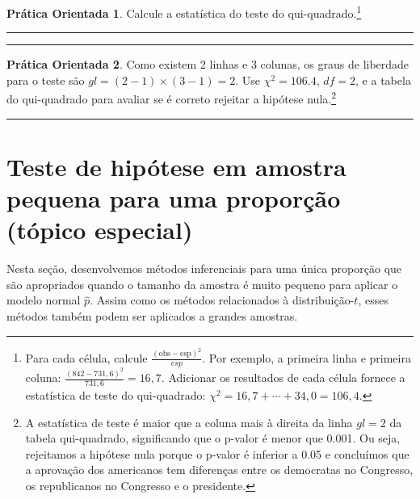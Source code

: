 \documentclass[
]{book}
\theoremstyle{definition}
\theoremstyle{definition}
\theoremstyle{definition}
\newtheorem{exercise}{Prática Orientada}[chapter]
\theoremstyle{definition}
\theoremstyle{remark}
\begin{document}
\begin{exercise}
\protect\hypertarget{exr:unnamed-chunk-254}{}{\label{exr:unnamed-chunk-254} }Calcule a estatística do teste do qui-quadrado.\footnote{Para cada célula, calcule \(\frac{(\text{obs} - \text{esp})^2}{esp}\). Por exemplo, a primeira linha e primeira coluna: \(\frac{(842-731,6)^2}{731,6} = 16,7\). Adicionar os resultados de cada célula fornece a estatística de teste do qui-quadrado: \(\chi^2 = 16,7 + \cdots + 34,0 = 106,4\).}
\end{exercise}

\begin{center}\rule{0.5\linewidth}{0.5pt}\end{center}

\begin{center}\rule{0.5\linewidth}{0.5pt}\end{center}

\begin{exercise}
\protect\hypertarget{exr:unnamed-chunk-255}{}{\label{exr:unnamed-chunk-255} }Como existem 2 linhas e 3 colunas, os graus de liberdade para o teste são \(gl=(2-1) \times (3-1) = 2\). Use \(\chi^2 = 106.4\), \(df=2\), e a tabela do qui-quadrado para avaliar se é correto rejeitar a hipótese nula.\footnote{A estatística de teste é maior que a coluna mais à direita da linha \(gl = 2\) da tabela qui-quadrado, significando que o p-valor é menor que 0.001. Ou seja, rejeitamos a hipótese nula porque o p-valor é inferior a 0.05 e concluímos que a aprovação dos americanos tem diferenças entre os democratas no Congresso, os republicanos no Congresso e o presidente.}
\end{exercise}

\begin{center}\rule{0.5\linewidth}{0.5pt}\end{center}

\hypertarget{smallSampleHTForProportion}{%
\section{Teste de hipótese em amostra pequena para uma proporção (tópico especial)}\label{smallSampleHTForProportion}}

Nesta seção, desenvolvemos métodos inferenciais para uma única proporção que são apropriados quando o tamanho da amostra é muito pequeno para aplicar o modelo normal \(\hat{p}\). Assim como os métodos relacionados à distribuição-\(t\), esses métodos também podem ser aplicados a grandes amostras.
\end{document}
